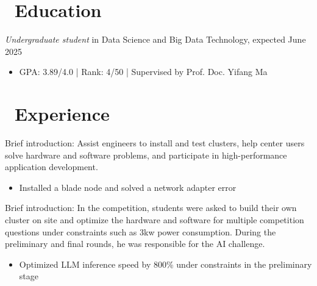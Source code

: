 \documentclass{resume}
\begin{document}



\section{\faGraduationCap\ Education}
\textit{Undergraduate student} in Data Science and Big Data Technology, expected June 2025
\begin{itemize}
    \item GPA: 3.89/4.0 | Rank: 4/50 | Supervised by Prof. Doc. Yifang Ma
\end{itemize}

\section{\faUsers\ Experience}
Brief introduction: Assist engineers to install and test clusters, help center users solve hardware and software problems, and participate in high-performance application development.
\begin{itemize}
  \item Installed a blade node and solved a network adapter error
\end{itemize}

Brief introduction: In the competition, students were asked to build their own cluster on site and optimize the hardware and software for multiple competition questions under constraints such as 3kw power consumption. During the preliminary and final rounds, he was responsible for the AI challenge. 
\begin{itemize}
  \item Optimized LLM inference speed by 800\% under constraints in the preliminary stage
\end{itemize}
\end{document}
